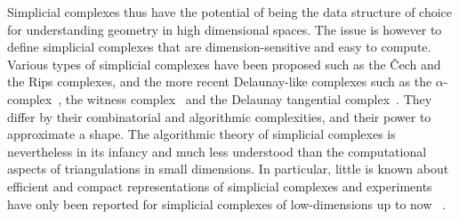 Simplicial complexes thus have the potential of being the data structure of choice for understanding geometry in high dimensional spaces. The issue is however to define simplicial complexes that are dimension-sensitive and easy to compute.  Various types of simplicial complexes have been proposed such as the \v{C}ech and the Rips complexes, and the more recent Delaunay-like complexes such as the $\alpha$-complex~\cite{eks-sspp-83,he-ubds-95}, the witness complex~\cite{deSilva2008,cds-tewc-2004} and the Delaunay tangential complex~\cite{geometrica-7142i}. They differ by their combinatorial and algorithmic complexities, and their power to approximate a shape.  The algorithmic theory of simplicial complexes is nevertheless in its infancy and much less understood than the computational aspects of triangulations in small dimensions. In particular, little is known about efficient and compact representations of simplicial complexes and experiments have only been reported for simplicial complexes of low-dimensions up to now ~\cite{rg-bptd-2008}.  











